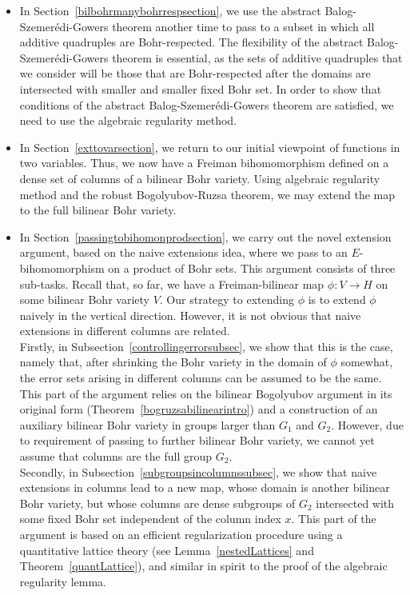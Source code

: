 \documentclass[a4paper,11pt]{article}
\numberwithin{theorem}{section}
\theoremstyle{definition}
\begin{document}
\begin{itemize}
    \item[\textbf{Step 6.}] In Section~\ref{bilbohrmanybohrrespsection}, we use the abstract Balog-Szemer\'edi-Gowers theorem another time to pass to a subset in which all additive quadruples are Bohr-respected. The flexibility of the abstract Balog-Szemer\'edi-Gowers theorem is essential, as the sets of additive quadruples that we consider will be those that are Bohr-respected after the domains are intersected with smaller and smaller fixed Bohr set. In order to show that conditions of the abstract Balog-Szemer\'edi-Gowers theorem are satisfied, we need to use the algebraic regularity method.
    \item[\textbf{Step 7.}] In Section~\ref{exttovarsection}, we return to our initial viewpoint of functions in two variables. Thus, we now have a Freiman bihomomorphism defined on a dense set of columns of a bilinear Bohr variety. Using algebraic regularity method and the robust Bogolyubov-Ruzsa theorem, we may extend the map to the full bilinear Bohr variety.
    \item[\textbf{Step 8.}] In Section~\ref{passingtobihomonprodsection}, we carry out the novel extension argument, based on the naive extensions idea, where we pass to an $E$-bihomomorphism on a product of Bohr sets. This argument consists of three sub-tasks. Recall that, so far, we have a Freiman-bilinear map $\phi : V \to H$ on some bilinear Bohr variety $V$. Our strategy to extending $\phi$ is to extend $\phi$ naively in the vertical direction. However, it is not obvious that naive extensions in different columns are related.\\
    \phantom{a}\hspace{12pt} Firstly, in Subsection~\ref{controllingerrorsubsec}, we show that this is the case, namely that, after shrinking the Bohr variety in the domain of $\phi$ somewhat, the error sets arising in different columns can be assumed to be the same. This part of the argument relies on the bilinear Bogolyubov argument in its original form (Theorem~\ref{bogruzsabilinearintro}) and a construction of an auxiliary bilinear Bohr variety in groups larger than $G_1$ and $G_2$. However, due to requirement of passing to further bilinear Bohr variety, we cannot yet assume that columns are the full group $G_2$.\\
    \phantom{a}\hspace{12pt} Secondly, in Subsection~\ref{subgroupsincolumnssubsec}, we show that naive extensions in columns lead to a new map, whose domain is another bilinear Bohr variety, but whose columns are dense subgroups of $G_2$ intersected with some fixed Bohr set independent of the column index $x$. This part of the argument is based on an efficient regularization procedure using a quantitative lattice theory (see Lemma~\ref{nestedLattices} and Theorem~\ref{quantLattice}), and similar in spirit to the proof of the algebraic regularity lemma. \\

\end{itemize}
\end{document}
